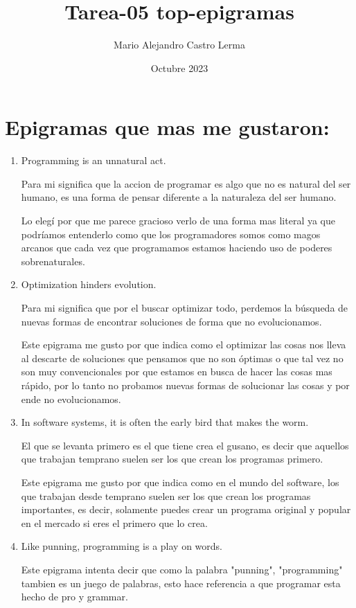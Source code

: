 \documentclass{article}
\title{Tarea-05 top-epigramas}
\author{Mario Alejandro Castro Lerma}
\date{Octubre 2023}
\begin{document}
\maketitle

\section{Epigramas que mas me gustaron:}
\begin{enumerate}
    \item Programming is an unnatural act.
    
    Para mi significa que la accion de programar es algo que no es natural del ser humano, es una forma de pensar diferente a la naturaleza del ser humano.
    
    Lo elegí por que me parece gracioso verlo de una forma mas literal ya que podríamos entenderlo como que los programadores somos como magos arcanos que cada vez que programamos estamos haciendo uso de poderes sobrenaturales.

    \item Optimization hinders evolution.

    Para mi significa que por el buscar optimizar todo, perdemos la búsqueda de nuevas formas de encontrar soluciones de forma que no evolucionamos.
    
    Este epigrama me gusto por que indica como el optimizar las cosas nos lleva al descarte de soluciones que pensamos que no son óptimas o que tal vez no son muy convencionales por que estamos en busca de hacer las cosas mas rápido, por lo tanto no probamos nuevas formas de solucionar las cosas y por ende no evolucionamos.

    \item In software systems, it is often the early bird that makes the worm.

    El que se levanta primero es el que tiene crea el gusano, es decir que aquellos que trabajan temprano suelen ser los que crean los programas primero.
    
    Este epigrama me gusto por que indica como en el mundo del software, los que trabajan desde temprano suelen ser los que crean los programas importantes, es decir, solamente puedes crear un programa original y popular en el mercado si eres el primero que lo crea.

    \item Like punning, programming is a play on words.
    
    Este epigrama intenta decir que como la palabra "punning", "programming" tambien es un juego de palabras, esto hace referencia a que programar esta hecho de pro y grammar.
    

\end{enumerate}
\end{document}
